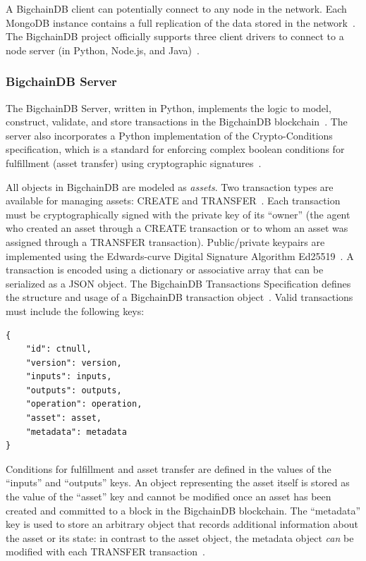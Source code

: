 A BigchainDB client can potentially connect to any node in the network.
Each MongoDB instance contains a full replication of the data stored in the
network~\cite{bdb18}. The BigchainDB project officially supports three
client drivers to connect to a node server (in Python, Node.js, and
Java)~\cite{bdb18f}.

\subsubsection{BigchainDB Server}
The BigchainDB Server, written in Python, implements the logic to
model, construct, validate, and store transactions in the BigchainDB
blockchain~\cite{troyM18b}. The server also incorporates a Python
implementation of the Crypto-Conditions specification, which is a standard
for enforcing complex boolean conditions for fulfillment (asset transfer)
using cryptographic signatures~\cite{cryptocon}.

All objects in BigchainDB are modeled as \emph{assets}. Two transaction types 
are available for managing assets: CREATE and TRANSFER~\cite{troyM18c}. Each 
transaction must be cryptographically signed with the private key of its 
``owner'' (the agent who created an asset through a CREATE transaction or to 
whom an asset was assigned through a TRANSFER transaction). Public/private 
keypairs are implemented using the Edwards-curve Digital Signature Algorithm 
Ed25519~\cite{troyM18c}. A transaction is encoded using a dictionary or 
associative array that can be serialized as a JSON object. The BigchainDB 
Transactions Specification defines the structure and usage of a BigchainDB 
transaction object~\cite{troyM18c}. Valid transactions must include the 
following keys:

\begin{verbatim}
{
    "id": ctnull,
    "version": version,
    "inputs": inputs,
    "outputs": outputs,
    "operation": operation,
    "asset": asset,
    "metadata": metadata
}	
\end{verbatim}

Conditions for fulfillment and asset transfer are defined in the values
of the ``inputs'' and ``outputs'' keys. An object representing the asset
itself is stored as the value of the ``asset'' key and cannot be modified
once an asset has been created and committed to a block in the BigchainDB
blockchain. The ``metadata'' key is used to store an arbitrary object that
records additional information about the asset or its state: in contrast to
the asset object, the metadata object \emph{can} be modified with each
TRANSFER transaction~\cite{troyM18c}.


